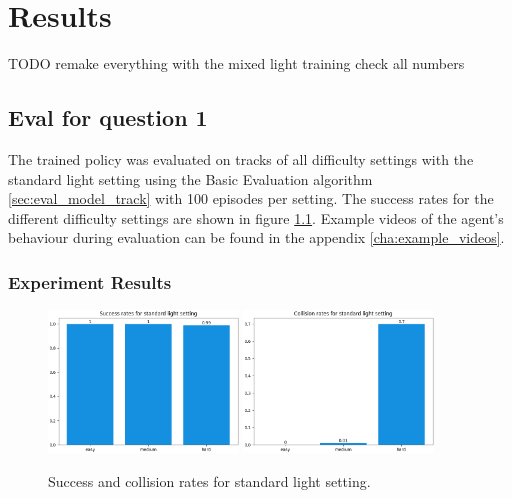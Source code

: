 \chapter{Results}
\label{cha:Results}

TODO remake everything with the mixed light training
check all numbers

\section{Eval for question 1}

The trained policy was evaluated on tracks of all difficulty settings with the standard light setting using the Basic Evaluation algorithm \ref{sec:eval_model_track} with 100 episodes per setting. The success rates for the different difficulty settings are shown in figure \ref{fig:result_success_rates_standard}. Example videos of the agent's behaviour during evaluation can be found in the appendix \ref{cha:example_videos}.

\subsection{Experiment Results}

\begin{figure}
    \centering
    \includegraphics[width=0.45\textwidth]{Bilder/notebook_images/hardDistanceMixedLight_eval_standard_success_rates_barplot.png}
    \includegraphics[width=0.45\textwidth]{Bilder/notebook_images/hardDistanceMixedLight_eval_standard_collision_rates_barplot.png}
    \caption{Success and collision rates for standard light setting.}
    \label{fig:result_success_rates_standard}
\end{figure}


